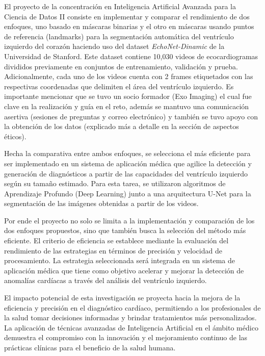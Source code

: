 \documentclass[runningheads]{llncs}
\begin{document}
El proyecto de la concentración en Inteligencia Artificial Avanzada para la Ciencia de Datos II consiste en implementar y comparar el rendimiento de dos enfoques, uno basado en máscaras binarias y el otro en máscaras usando puntos de referencia (landmarks) para la segmentación automática del ventrículo izquierdo del corazón haciendo uso del dataset  \textit{EchoNet-Dinamic} de la Universidad de Stanford. Este dataset contiene  10,030 videos de ecocardiogramas divididos previamente en conjuntos de entrenamiento, validación y prueba. Adicionalmente, cada uno de los videos cuenta con 2 frames etiquetados con las respectivas coordenadas que delimiten el área del ventrículo izquierdo. Es importante mencionar que se tuvo un socio formador (Exo Imaging) el cual fue clave en la realización y guía en el reto, además se mantuvo una comunicación asertiva (sesiones de preguntas y correo electrónico) y también se tuvo apoyo con la obtención de los datos (explicado más a detalle en la sección de aspectos éticos).

Hecha la comparativa entre ambos enfoques, se selecciona el más eficiente para ser implementado en un sistema de aplicación médica que agilice la detección y generación de diagnósticos a partir de las capacidades del ventrículo izquierdo según su tamaño estimado. Para esta tarea, se utilizaron algoritmos de Aprendizaje Profundo (Deep Learning) junto a  una arquitectura U-Net para la segmentación de las imágenes obtenidas a partir de los videos.

Por ende el proyecto no solo se limita a la implementación y comparación de los dos enfoques propuestos, sino que también busca la selección del método más eficiente. El criterio de eficiencia se establece mediante la evaluación del rendimiento de las estrategias en términos de precisión y velocidad de procesamiento. La estrategia seleccionada será integrada en un sistema de aplicación médica que tiene como objetivo acelerar y mejorar la detección de anomalías cardíacas a través del análisis del ventrículo izquierdo.

El impacto potencial de esta investigación se proyecta hacia la mejora de la eficiencia y precisión en el diagnóstico cardíaco, permitiendo a los profesionales de la salud tomar decisiones informadas y brindar tratamientos más personalizados. La aplicación de técnicas avanzadas de Inteligencia Artificial en el ámbito médico demuestra el compromiso con la innovación y el mejoramiento continuo de las prácticas clínicas para el beneficio de la salud humana.
\end{document}
